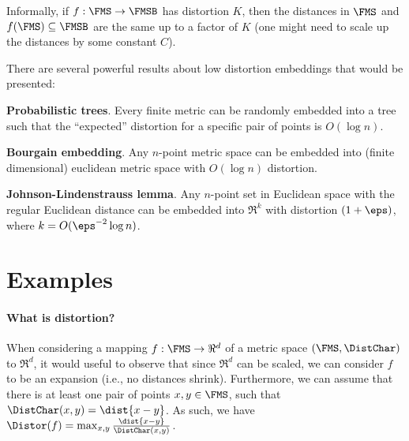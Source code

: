 Informally, if $f:\FMS \to \FMSB$ has distortion $K$, then the
distances in $\FMS$ and $f(\FMS) \subseteq \FMSB$ are the same up to a
factor of $K$ (one might need to scale up the distances by some
constant $C$).



There are several powerful results about low distortion embeddings
that would be presented:
\begin{compactenumI}
    \smallskip%
    \item \textbf{Probabilistic trees}. Every finite metric can be randomly
    embedded into a tree such that the ``expected'' distortion for a
    specific pair of points is $O( \log n)$.

    \smallskip%
    \item \textbf{Bourgain embedding}. Any $n$-point metric space can be
    embedded into (finite dimensional) euclidean metric space with
    $O( \log n )$ distortion.

    \smallskip%
    \item \textbf{Johnson-Lindenstrauss lemma}. Any $n$-point set in
    Euclidean space with the regular Euclidean distance can be
    embedded into $\Re^k$ with distortion $(1+\eps)$, where
    $k = O(\eps^{-2} \log n)$.
\end{compactenumI}



\section{Examples} 


\paragraph*{What is distortion?}
When considering a mapping $f:\FMS \rightarrow \Re^d$ of a metric
space $(\FMS, \DistChar)$ to $\Re^d$, it would useful to observe that
since $\Re^d$ can be scaled, we can consider $f$ to be an expansion
(i.e., no distances shrink).  Furthermore, we can assume that there is
at least one pair of points $x, y \in \FMS$, such that
$\DistChar(x,y) = \dist{x-y}$. As such, we have
$\Distor(f) = \max_{x,y} \frac{\dist{x - y}}{\DistChar(x,y)}$.


